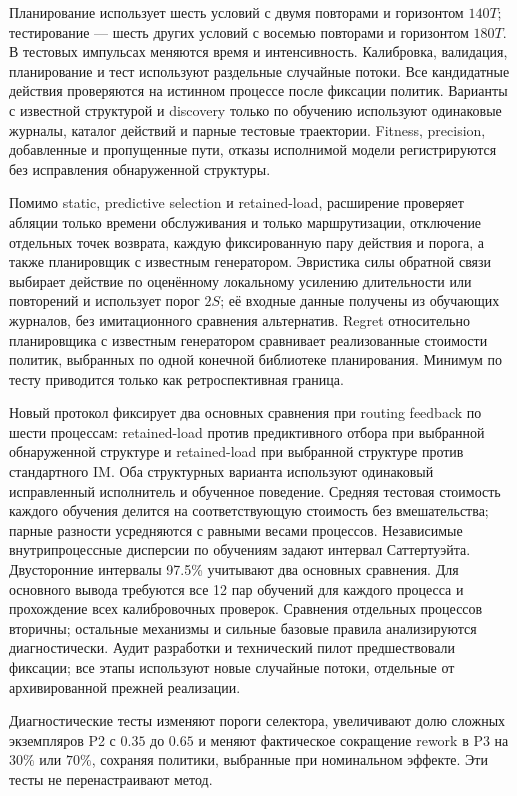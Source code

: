 Планирование использует шесть условий с двумя повторами и горизонтом $140T$; тестирование — шесть других условий с восемью повторами и горизонтом $180T$. В тестовых импульсах меняются время и интенсивность. Калибровка, валидация, планирование и тест используют раздельные случайные потоки. Все кандидатные действия проверяются на истинном процессе после фиксации политик. Варианты с известной структурой и discovery только по обучению используют одинаковые журналы, каталог действий и парные тестовые траектории. Fitness, precision, добавленные и пропущенные пути, отказы исполнимой модели регистрируются без исправления обнаруженной структуры.

Помимо static, predictive selection и retained-load, расширение проверяет абляции только времени обслуживания и только маршрутизации, отключение отдельных точек возврата, каждую фиксированную пару действия и порога, а также планировщик с известным генератором. Эвристика силы обратной связи выбирает действие по оценённому локальному усилению длительности или повторений и использует порог $2S$; её входные данные получены из обучающих журналов, без имитационного сравнения альтернатив. Regret относительно планировщика с известным генератором сравнивает реализованные стоимости политик, выбранных по одной конечной библиотеке планирования. Минимум по тесту приводится только как ретроспективная граница.

Новый протокол фиксирует два основных сравнения при routing feedback по шести процессам: retained-load против предиктивного отбора при выбранной обнаруженной структуре и retained-load при выбранной структуре против стандартного IM. Оба структурных варианта используют одинаковый исправленный исполнитель и обученное поведение. Средняя тестовая стоимость каждого обучения делится на соответствующую стоимость без вмешательства; парные разности усредняются с равными весами процессов. Независимые внутрипроцессные дисперсии по обучениям задают интервал Саттертуэйта. Двусторонние интервалы 97.5\% учитывают два основных сравнения. Для основного вывода требуются все 12 пар обучений для каждого процесса и прохождение всех калибровочных проверок. Сравнения отдельных процессов вторичны; остальные механизмы и сильные базовые правила анализируются диагностически. Аудит разработки и технический пилот предшествовали фиксации; все этапы используют новые случайные потоки, отдельные от архивированной прежней реализации.

Диагностические тесты изменяют пороги селектора, увеличивают долю сложных экземпляров P2 с $0.35$ до $0.65$ и меняют фактическое сокращение rework в P3 на $30\%$ или $70\%$, сохраняя политики, выбранные при номинальном эффекте. Эти тесты не перенастраивают метод.
